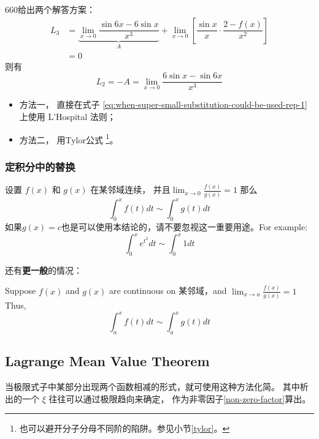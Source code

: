 \begin{example}
    660给出两个解答方案：
    \begin{align*}
        L_3 &= \underbrace{\lim_{x \to 0} \dfrac{\sin 6x - 6 \sin x}{x^3}}_{A} + 
               \lim_{x \to 0} \left[\dfrac{\sin x}{x} \cdot \dfrac{2 - f(x)}{x^2}\right] \\
            &= 0
    \end{align*}
    则有
    \begin{equation}
        \label{eq:when-super-small-substitution-could-be-used-rep-1}
        L_2 = -A = \lim_{x \to 0} \dfrac{6 \sin x - \sin 6x}{x^3}
    \end{equation}
    \begin{itemize}
        \item 方法一，
            直接在式子
            \ref{eq:when-super-small-substitution-could-be-used-rep-1} 
            上使用 L'Hospital 法则；
        \item 方法二，
            用Tylor公式
            \footnote{也可以避开分子分母不同阶的陷阱。参见小节\ref{tylor}。}。
    \end{itemize}
\end{example}

\subsubsection{定积分中的替换}
\label{limit-rerepresenting-in-variable-limits-integral}
设置 $f(x)$ 和 $g(x)$ 在某邻域连续，
并且$\lim_{x \to 0} \frac{f(x)}{g(x)} = 1$
那么
\begin{equation}
	\int_0^{x} f(t) dt \sim \int_0^{x} g(t) dt
\end{equation}
如果$g(x)=c$也是可以使用本结论的，请不要忽视这一重要用途。For example:
\[
\int_0^x e^{t^2} dt \sim \int_0^{x} 1 dt
\]

还有\textbf{更一般}的情况：
\begin{lemma}
	Suppose $f(x)$ and $g(x)$ are continuous on 某邻域，and $\lim_{x \to a} \frac{f(x)}{g(x)} = 1$ 
	Thus, 
	\begin{equation}
		\int_a^{x} f(t) dt \sim \int_a^{x} g(t) dt
	\end{equation}
\end{lemma}

\subsection{Lagrange Mean Value Theorem} \label{lagrange-limit}
当极限式子中某部分出现两个函数相减的形式，就可使用这种方法化简。
其中析出的一个 $\xi$ 往往可以通过极限趋向来确定，
作为非零因子\ref{non-zero-factor}算出。

